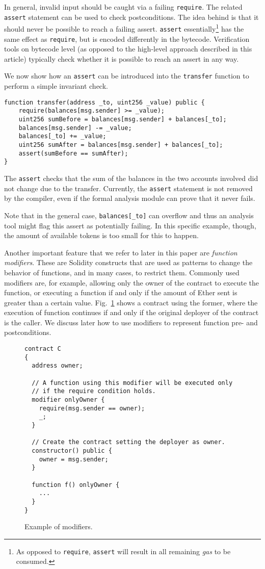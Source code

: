 In general, invalid input should be caught via a failing \texttt{require}.
The related \texttt{assert} statement can be used to check postconditions.
The idea behind is that it should never be possible to reach a failing
assert.
\texttt{assert} essentially\footnote{As opposed to \texttt{require},
\texttt{assert} will result in all remaining \emph{gas} to be consumed.}
has the same effect as \texttt{require}, but
is encoded differently in the bytecode. Verification tools on bytecode
level (as opposed to the high-level approach described in this article)
typically check whether it is possible to reach an assert in any way.

We now show how an \texttt{assert} can be introduced into the \texttt{transfer} function
to perform a simple invariant check.
\begin{verbatim}
function transfer(address _to, uint256 _value) public {
    require(balances[msg.sender] >= _value);
    uint256 sumBefore = balances[msg.sender] + balances[_to];
    balances[msg.sender] -= _value;
    balances[_to] += _value;
    uint256 sumAfter = balances[msg.sender] + balances[_to];
    assert(sumBefore == sumAfter);
}
\end{verbatim}

The \texttt{assert} checks that the sum of the balances in the two
accounts involved did not change due to the transfer. Currently,
the \texttt{assert} statement is not removed by the compiler, even
if the formal analysis module can prove that it never fails.

Note that in the general case, \verb+balances[_to]+ can overflow
and thus an analysis tool might flag this assert as potentially
failing. In this specific example, though, the amount of available tokens
is too small for this to happen.

Another important feature that we refer to later in this paper are
\emph{function modifiers}.
%
These are Solidity constructs that are used as patterns to
change the behavior of functions, and in many cases, to restrict them.
%
Commonly used modifiers are, for example, allowing only the owner of the
contract to execute the function, or executing a function if and only if the
amount of Ether sent is greater than a certain value.
%
Fig.~\ref{fig:modifiers} shows a contract using the former, where the
execution of function  continues if and only if the original deployer
of the contract is the caller.
%
We discuss later how to use modifiers to represent function pre- and
postconditions.

\begin{figure}
\begin{verbatim}
contract C
{
  address owner;

  // A function using this modifier will be executed only
  // if the require condition holds.
  modifier onlyOwner {
    require(msg.sender == owner);
    _;
  }

  // Create the contract setting the deployer as owner.
  constructor() public {
    owner = msg.sender;
  }

  function f() onlyOwner {
    ...
  }
}
\end{verbatim}
\caption{Example of modifiers.}
\label{fig:modifiers}
\end{figure}

